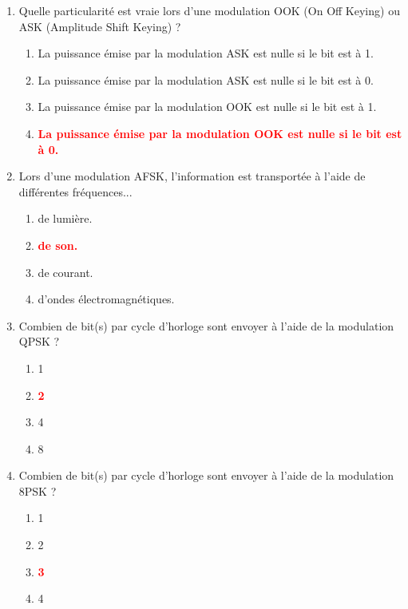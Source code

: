 \documentclass[a4paper]{article}
\begin{document}
\begin{enumerate}[label=Q\arabic*.]


\item Quelle particularité est vraie lors d'une modulation OOK (On Off Keying) ou ASK (Amplitude Shift Keying) ?
\begin{enumerate}
    \item La puissance émise par la modulation ASK est nulle si le bit est à 1.
    \item La puissance émise par la modulation ASK est nulle si le bit est à 0.
    \item La puissance émise par la modulation OOK est nulle si le bit est à 1.
    \item \textcolor{red}{\textbf{La puissance émise par la modulation OOK est nulle si le bit est à 0.}}
\end{enumerate}


\item Lors d'une modulation AFSK, l'information est transportée à l'aide de différentes fréquences...
\begin{enumerate}
    \item de lumière.
    \item \textcolor{red}{\textbf{de son.}}
    \item de courant.
    \item d'ondes électromagnétiques.
\end{enumerate}


\item Combien de bit(s) par cycle d'horloge sont envoyer à l'aide de la modulation QPSK ?
\begin{enumerate}
    \item 1
    \item \textcolor{red}{\textbf{2}}
    \item 4
    \item 8
\end{enumerate}


\item Combien de bit(s) par cycle d'horloge sont envoyer à l'aide de la modulation 8PSK ?
\begin{enumerate}
    \item 1
    \item 2
    \item \textcolor{red}{\textbf{3}}
    \item 4
\end{enumerate}



\end{enumerate}
\end{document}

